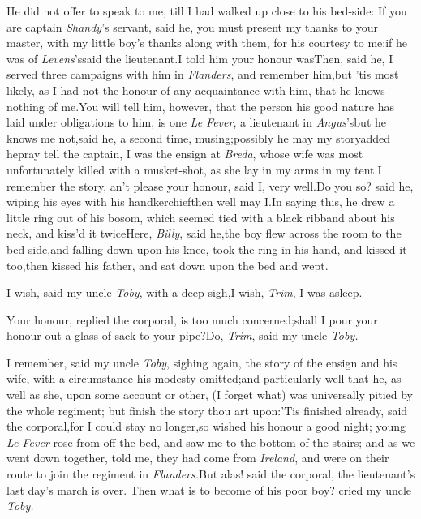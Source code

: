 \documentclass{article}
\begin{document}
He did not offer to speak to me, till\break
I had walked up close to his bed-side:\tsk\break
If you are captain \textit{Shandy}’s
servant, said he, you must present my thanks to your master, with
my little boy’s thanks along with them, for his courtesy to
me;\tsk if he was of \textit{Levens}’s\tsk said the
lieutenant.\tsk I told him your honour was\tsk Then, said he, I
served three campaigns with him in \textit{Flanders}, and remember
him,\tsk but ’tis most likely, as I had not the honour of
any acquaintance with him, that he knows nothing of me.\tsh You will tell him, however, that
the person his good nature has laid
under obligations to him, is one \textit{Le\break
Fever}, a lieutenant in \textit{Angus}’s\tsh but\break
he knows me not,\tsk said he, a second\break
time, musing;\tsh possibly he may my
story\tsk added he\tsk pray tell the captain, I was the ensign
at \textit{Breda}, whose wife was most unfortunately killed with a
musket-shot, as she lay in my arms in my tent.\tsh I
remember the story, an’t please your honour, said I, very
well.\break\tsh Do you so? said he, wiping his eyes with his
handkerchief\tsk then well may I.\tsk In saying this, he drew a
little ring out of his bosom, which seemed tied with a black
ribband about his neck, and kiss’d it
twice\tsh Here, \textit{Billy}, said he,\tsk the boy flew
across the room to the bed-side,\tsk and falling down upon his
knee, took the ring in his hand, and kissed it too,\tsk then
kissed his father, and sat down upon the bed and wept.

I wish, said my uncle \textit{Toby}, with a deep sigh,\tsk I
wish, \textit{Trim}, I was asleep.

Your honour, replied the corporal, is too much
concerned;\tsk shall I pour your honour out a glass of sack to
your pipe?\tsh Do, \textit{Trim}, said my uncle
\textit{Toby.}

I remember, said my uncle \textit{Toby}, sighing again, the story
of the ensign and his wife, with a circumstance his modesty
omitted;\tsk and particularly well that he, as well as she, upon
some account or other, (I forget what) was universally pitied by the
whole regiment; \tsk but finish the story thou art
upon:\break\tsk ’Tis finished already, said the
corporal,\tsk for I could stay no longer,\tsk so wished his
honour a good night; young \textit{Le Fever} rose from off the bed,
and saw me to the bottom of the stairs; and as we went down
together, told me, they had come from \textit{Ireland}, and were on
their route to join the regiment in
\textit{Flanders.}\tsh But alas! said the
corporal,\tsk\break
the lieutenant’s last day’s march is over.
\break\tsk Then what is to become of his poor boy? cried my uncle
\textit{Toby.}
\end{document}
